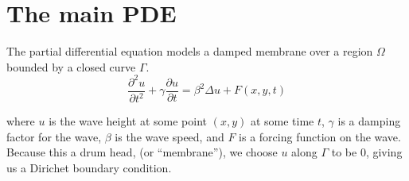 \documentclass[a4paper,12pt]{article}
\begin{document}
\newcommand{\innerproduct}[2]{\int\limits_{\Omega} #1 #2 d\Omega}
\newcommand{\innerproductdot}[2]{\int\limits_{\Omega} \nabla #1 \cdot \nabla #2 d\Omega}
\newcommand{\firstderivative}[2]{\frac{d #1}{d #2}}
\newcommand{\secondderivative}[2]{\frac{d^2 #1}{d #2^2}}
\newcommand{\firstpartial}[2]{\frac{\partial #1}{\partial #2}}
\newcommand{\secondpartial}[2]{\frac{\partial^2 #1}{\partial #2^2}}
\newcommand{\laplacian}[1]{\Delta #1}
\newcommand{\secondfinitediff}[1]{\frac{#1^{n+1} - 2#1^n + #1^{n-1}}{\delta t^2}}
\newcommand{\firstfinitediff}[1]{\frac{#1^{n+1} - #1^{n-1}}{2\delta t}}
\newcommand{\step}[1]{\left( \frac{1}{\delta t^2} #1 \frac{\gamma}{2\delta t} \right)}
\newcommand{\mat}[2][rrrr]{
    \left(\begin{array}{#1}
    #2 \\
    \end{array}
    \right)
}

\section{The main PDE}
The partial differential equation models a damped membrane over a region $\Omega$ bounded by a closed curve $\Gamma$.
\begin{equation} \label{eq:main_pde}
\secondpartial{u}{t} + \gamma \firstpartial{u}{t}
=
\beta^2 \laplacian{u} + F(x,y,t)
\end{equation}

where $u$ is the wave height at some point $(x,y)$ at some time $t$, $\gamma$ is a damping factor for the wave,
$\beta$ is the wave speed, and $F$ is a forcing function on the wave. Because this a drum head, (or ``membrane''), we choose
$u$ along $\Gamma$ to be 0, giving us a Dirichet boundary condition.





\end{document}

